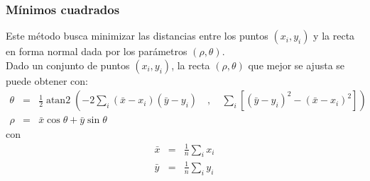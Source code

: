 \documentclass[10pt,spanish,aspectratio=1610]{beamer}
\DeclareMathOperator{\atantwo}{atan2}
\begin{document}
\begin{frame}\frametitle{Mínimos cuadrados}
  Este método busca minimizar las distancias entre los puntos $(x_i,y_i)$ y la recta en forma normal dada por los parámetros $(\rho, \theta)$.
  \[\]
  Dado un conjunto de puntos $(x_i, y_i)$, la recta $(\rho,\theta)$ que mejor se ajusta se puede obtener con:
  \begin{eqnarray*}
    \theta &=& \frac{1}{2}\atantwo\left(-2\sum_i (\bar{x} - x_i)(\bar{y}-y_i)\quad,\quad \sum_i\left[(\bar{y} - y_i)^2 - (\bar{x} - x_i)^2\right]\right)\\
    \rho &=& \bar{x}\cos\theta + \bar{y}\sin\theta
  \end{eqnarray*}
  con
  \begin{eqnarray*}
    \bar{x} &=& \frac{1}{n}\sum_i x_i\\
    \bar{y} &=& \frac{1}{n}\sum_i y_i
  \end{eqnarray*}
\end{frame}
\end{document}
